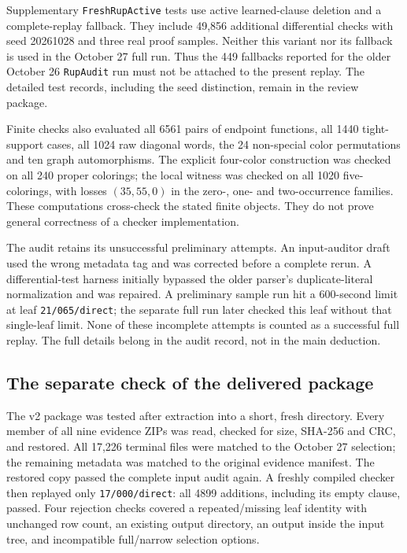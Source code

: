 Supplementary \texttt{FreshRupActive} tests use active learned-clause
deletion and a complete-replay fallback. They include 49,856 additional
differential checks with seed 20261028 and three real proof samples.
Neither this variant nor its fallback is used in the October 27 full
run. Thus the 449 fallbacks reported for the older October 26
\texttt{RupAudit} run must not be attached to the present replay.
The detailed test records, including the seed distinction, remain in the
review package.

Finite checks also evaluated all 6561 pairs of endpoint functions, all
1440 tight-support cases, all 1024 raw diagonal words, the 24 non-special
color permutations and ten graph automorphisms. The explicit four-color
construction was checked on all 240 proper colorings; the local witness
was checked on all 1020 five-colorings, with losses $(35,55,0)$ in the
zero-, one- and two-occurrence families. These computations cross-check
the stated finite objects. They do not prove general correctness of a
checker implementation.

The audit retains its unsuccessful preliminary attempts. An input-auditor
draft used the wrong metadata tag and was corrected before a complete
rerun. A differential-test harness initially bypassed the older parser's
duplicate-literal normalization and was repaired. A preliminary sample
run hit a 600-second limit at leaf \texttt{21/065/direct}; the separate
full run later checked this leaf without that single-leaf limit. None of
these incomplete attempts is counted as a successful full replay. The
full details belong in the audit record, not in the main deduction.

\subsection{The separate check of the delivered package}
The v2 package was tested after extraction into a short, fresh directory.
Every member of all nine evidence ZIPs was read, checked for size,
SHA-256 and CRC, and restored. All 17,226 terminal files were matched to
the October 27 selection; the remaining metadata was matched to the
original evidence manifest. The restored copy passed the complete input
audit again. A freshly compiled checker then replayed only
\texttt{17/000/direct}: all 4899 additions, including its empty clause,
passed. Four rejection checks covered a repeated/missing leaf identity
with unchanged row count, an existing output directory, an output inside
the input tree, and incompatible full/narrow selection options.

